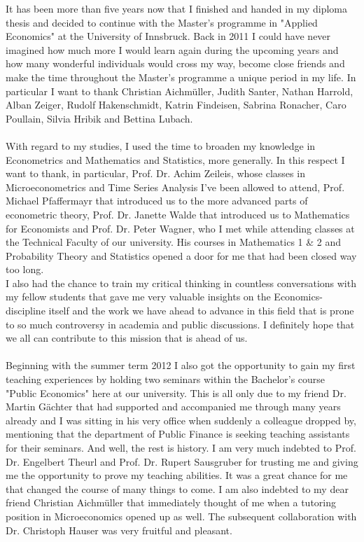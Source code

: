 It has been more than five years now that I finished and handed in my diploma thesis and decided to continue with the Master's programme in "Applied Economics" at the University of Innsbruck. Back in 2011 I could have never imagined how much more I would learn again during the upcoming years and how many wonderful individuals would cross my way, become close friends and make the time throughout the Master's programme a unique period in my life. In particular I want to thank Christian Aichmüller, Judith Santer, Nathan Harrold, Alban Zeiger, Rudolf Hakenschmidt, Katrin Findeisen, Sabrina Ronacher, Caro Poullain, Silvia Hribik and Bettina Lubach. \\ 
\\
With regard to my studies, I used the time to broaden my knowledge in Econometrics and Mathematics and Statistics, more generally. In this respect I want to thank, in particular, Prof. Dr. Achim Zeileis, whose classes in Microeconometrics and Time Series Analysis I've been allowed to attend, Prof. Michael Pfaffermayr that introduced us to the more advanced parts of econometric theory, Prof. Dr. Janette Walde that introduced us to Mathematics for Economists and Prof. Dr. Peter Wagner, who I met while attending classes at the Technical Faculty of our university. His courses in Mathematics 1 \& 2 and Probability Theory and Statistics opened a door for me that had been closed way too long.\\
I also had the chance to train my critical thinking in countless conversations with my fellow students that gave me very valuable insights on the Economics-discipline itself and the work we have ahead to advance in this field that is prone to so much controversy in academia and public discussions. I definitely hope that we all can contribute to this mission that is ahead of us.\\
\\
Beginning with the summer term 2012 I also got the opportunity to gain my first teaching experiences by holding two seminars within the Bachelor's course "Public Economics" here at our university. This is all only due to my friend Dr. Martin Gächter that had supported and accompanied me through many years already and I was sitting in his very office when suddenly a colleague dropped by, mentioning that the department of Public Finance is seeking teaching assistants for their seminars. And well, the rest is history.
\newpage
I am very much indebted to Prof. Dr. Engelbert Theurl and Prof. Dr. Rupert Sausgruber for trusting me and giving me the opportunity to prove my teaching abilities. It was a great chance for me that changed the course of many things to come. I am also indebted to my dear friend Christian Aichmüller that immediately thought of me when a tutoring position in Microeconomics opened up as well. The subsequent collaboration with Dr. Christoph Hauser was very fruitful and pleasant.\\
